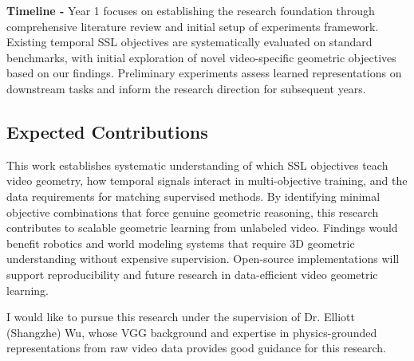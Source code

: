 \documentclass{article}
\begin{document}
\textbf{Timeline - }Year 1 focuses on establishing the research foundation through comprehensive literature review and initial setup of experiments framework. Existing temporal SSL objectives are systematically evaluated on standard benchmarks, with initial exploration of novel video-specific geometric objectives based on our findings. Preliminary experiments assess learned representations on downstream tasks and inform the research direction for subsequent years.
\subsection{Expected Contributions}

This work establishes systematic understanding of which SSL objectives teach video geometry, how temporal signals interact in multi-objective training, and the data requirements for matching supervised methods. By identifying minimal objective combinations that force genuine geometric reasoning, this research contributes to scalable geometric learning from unlabeled video. Findings would benefit robotics and world modeling systems that require 3D geometric understanding without expensive supervision. Open-source implementations will support reproducibility and future research in data-efficient video geometric learning.

I would like to pursue this research under the supervision of Dr. Elliott (Shangzhe) Wu, whose VGG background 
and expertise in physics-grounded representations from raw video data provides good
guidance for this research.

\newpage
\printbibliography[title={References}]
\end{document}
